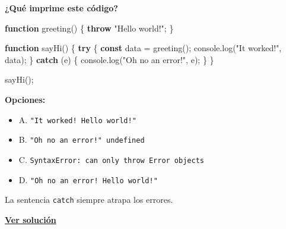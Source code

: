 \documentclass[
  letterpaper,
  DIV=11,
  numbers=noendperiod]{scrreprt}
\newenvironment{Shaded}{\begin{snugshade}}{\end{snugshade}}
\newcommand{\BuiltInTok}[1]{\textcolor[rgb]{0.00,0.23,0.31}{#1}}
\newcommand{\ControlFlowTok}[1]{\textcolor[rgb]{0.00,0.23,0.31}{\textbf{#1}}}
\newcommand{\FunctionTok}[1]{\textcolor[rgb]{0.28,0.35,0.67}{#1}}
\newcommand{\KeywordTok}[1]{\textcolor[rgb]{0.00,0.23,0.31}{\textbf{#1}}}
\newcommand{\NormalTok}[1]{\textcolor[rgb]{0.00,0.23,0.31}{#1}}
\newcommand{\OperatorTok}[1]{\textcolor[rgb]{0.37,0.37,0.37}{#1}}
\newcommand{\StringTok}[1]{\textcolor[rgb]{0.13,0.47,0.30}{#1}}
\providecommand{\tightlist}{%
  \setlength{\itemsep}{0pt}\setlength{\parskip}{0pt}}
\begin{document}
\textbf{¿Qué imprime este código?}

\begin{Shaded}
\begin{Highlighting}[]
\KeywordTok{function} \FunctionTok{greeting}\NormalTok{() \{}
  \ControlFlowTok{throw} \StringTok{"Hello world!"}\OperatorTok{;}
\NormalTok{\}}

\KeywordTok{function} \FunctionTok{sayHi}\NormalTok{() \{}
  \ControlFlowTok{try}\NormalTok{ \{}
    \KeywordTok{const}\NormalTok{ data }\OperatorTok{=} \FunctionTok{greeting}\NormalTok{()}\OperatorTok{;}
    \BuiltInTok{console}\OperatorTok{.}\FunctionTok{log}\NormalTok{(}\StringTok{"It worked!"}\OperatorTok{,}\NormalTok{ data)}\OperatorTok{;}
\NormalTok{  \} }\ControlFlowTok{catch}\NormalTok{ (e) \{}
    \BuiltInTok{console}\OperatorTok{.}\FunctionTok{log}\NormalTok{(}\StringTok{"Oh no an error!"}\OperatorTok{,}\NormalTok{ e)}\OperatorTok{;}
\NormalTok{  \}}
\NormalTok{\}}

\FunctionTok{sayHi}\NormalTok{()}\OperatorTok{;}
\end{Highlighting}
\end{Shaded}

\textbf{Opciones:}

\begin{itemize}
\tightlist
\item
  A. \texttt{"It\ worked!\ Hello\ world!"}
\item
  B. \texttt{"Oh\ no\ an\ error!"\ undefined}
\item
  C. \texttt{SyntaxError:\ can\ only\ throw\ Error\ objects}
\item
  D. \texttt{"Oh\ no\ an\ error!\ Hello\ world!"}
\end{itemize}

\begin{tcolorbox}[enhanced jigsaw, left=2mm, toprule=.15mm, leftrule=.75mm, breakable, colback=white, coltitle=black, bottomtitle=1mm, arc=.35mm, rightrule=.15mm, colframe=quarto-callout-tip-color-frame, opacitybacktitle=0.6, toptitle=1mm, opacityback=0, titlerule=0mm, title=\textcolor{quarto-callout-tip-color}{\faLightbulb}\hspace{0.5em}{Pista}, bottomrule=.15mm, colbacktitle=quarto-callout-tip-color!10!white]

La sentencia \texttt{catch} siempre atrapa los errores.

\end{tcolorbox}

\textbf{\hyperref[sec-sol-cap9-reto3]{Ver solución}}
\end{document}
